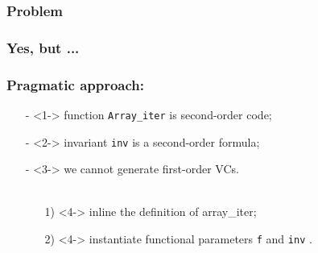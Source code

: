 \subsubsection*{Problem}
\begin{frame}
\frametitle<1-3>{\quad  Yes, but ...}
\frametitle<4->{\quad Pragmatic approach:}
\begin{itemize}
\item[-]<1-> function \texttt{Array\_iter} is second-order code;
\item[-]<2-> invariant \texttt{inv} is a second-order formula;
\item[-]<3-> {\color{red} we cannot generate first-order VCs.}\\[1cm]
~\\[0.5em]
\begin{itemize}
\item[\color{blue} 1)]<4-> {\color{blue} inline the definition of array\_iter};\\[1em]
\item[\color{blue} 2)]<4-> {\color{blue} instantiate functional parameters \texttt{f} and \texttt{inv} }.
\end{itemize}
\end{itemize}
\end{frame}
